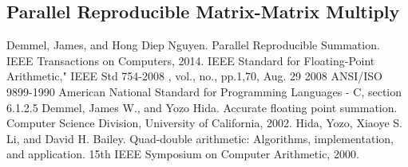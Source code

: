 \documentclass[12pt]{article}
\theoremstyle{plain}
\begin{document}
  \subsection{Parallel Reproducible Matrix-Matrix Multiply}
\begin{thebibliography}{9}
    Demmel, James, and Hong Diep Nguyen. Parallel Reproducible Summation. IEEE Transactions on Computers, 2014.
    IEEE Standard for Floating-Point Arithmetic," IEEE Std 754-2008 , vol., no., pp.1,70, Aug. 29 2008
    ANSI/ISO 9899-1990 American National Standard for Programming Languages - C, section 6.1.2.5
    Demmel, James W., and Yozo Hida. Accurate floating point summation. Computer Science Division, University of California, 2002.
    Hida, Yozo, Xiaoye S. Li, and David H. Bailey. Quad-double arithmetic: Algorithms, implementation, and application. 15th IEEE Symposium on Computer Arithmetic, 2000.
\end{thebibliography}
\end{document}
